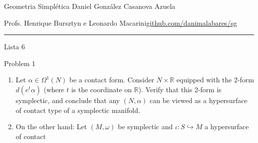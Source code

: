 
\usepackage[style=authortitle-terse,backend=bibtex]{biblatex}




\begin{minipage}{\textwidth}
	\begin{minipage}{1\textwidth}
		Geometria Simpl\'etica \hfill Daniel González Casanova Azuela
		
		{\small Profs. Henrique Bursztyn e Leonardo Macarini\hfill\href{https://github.com/danimalabares/sg}{github.com/danimalabares/sg}}
	\end{minipage}
\end{minipage}\vspace{.2cm}\hrule

\vspace{10pt}
{\huge Lista 6}

\tableofcontents

\begin{thing4}{Problem 1}\leavevmode
\begin{enumerate}[label=(\alph*)]
\item Let  $\alpha \in \Omega^{1}(N)$ be a contact form. Consider $N \times \mathbb{R}$ equipped with the 2-form $d(e^t\alpha)$ (where $t$ is the coordinate on $\mathbb{R}$). Verify that this 2-form is symplectic, and conclude that any $(N,\alpha)$ can be viewed as a hypersurface of contact type of a symplectic manifold.

\item On the other hand: Let $(M,\omega)$ be symplectic and $\iota:S\hookrightarrow M$ a hypersurface of contact 
\end{enumerate}
\end{thing4}


